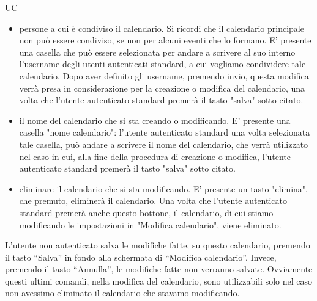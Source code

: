 \begin{listaPersonale}{UC}
\begin{listaPersonale2}[UC] {}
\begin{enumerate}
\begin{itemize}
                          \item persone a cui è condiviso il calendario. Si ricordi che il calendario principale non può essere condiviso, se non per alcuni eventi che lo formano. E' presente una casella che può essere selezionata per andare a scrivere al suo interno l'username degli utenti autenticati standard, a cui vogliamo condividere tale calendario.
                                Dopo aver definito gli username, premendo invio, questa modifica verrà presa in considerazione per la creazione o modifica del calendario, una volta che l'utente autenticato standard premerà il tasto "salva" sotto citato.
                          \item il nome del calendario che si sta creando o modificando. E' presente una casella "nome calendario": l'utente autenticato standard una volta selezionata tale casella, può andare a scrivere il nome del calendario, che verrà utilizzato nel caso in cui, alla fine della procedura di creazione o modifica, l'utente autenticato standard premerà il tasto "salva" sotto citato.
                          \item eliminare il calendario che si sta modificando. E' presente un tasto "elimina", che premuto, eliminerà il calendario. Una volta che l'utente autenticato standard premerà anche questo bottone, il calendario, di cui stiamo modificando le impostazioni in "Modifica calendario", viene eliminato.
                      \end{itemize}
                      L'utente non autenticato salva le modifiche fatte, su questo calendario, premendo il tasto “Salva” in fondo alla schermata di “Modifica calendario”. Invece, premendo il tasto “Annulla”, le modifiche fatte non verranno salvate. Ovviamente questi ultimi comandi, nella modifica del calendario, sono utilizzabili solo nel caso non avessimo eliminato il calendario che stavamo modificando.
            \end{enumerate}



\end{listaPersonale2}
\end{listaPersonale}
